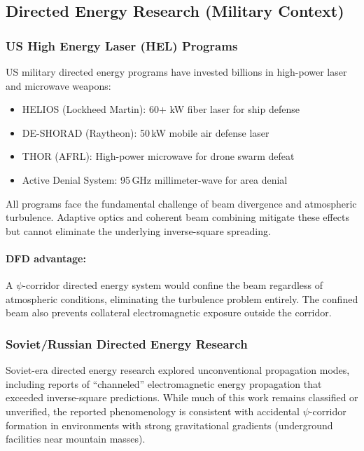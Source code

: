 \documentclass[11pt,a4paper]{article}
\begin{document}
\subsection{Directed Energy Research (Military Context)}

\subsubsection{US High Energy Laser (HEL) Programs}

US military directed energy programs have invested billions in
high-power laser and microwave weapons:
\begin{itemize}
\item HELIOS (Lockheed Martin): 60+ kW fiber laser for ship defense
\item DE-SHORAD (Raytheon): 50\,kW mobile air defense laser
\item THOR (AFRL): High-power microwave for drone swarm defeat
\item Active Denial System: 95\,GHz millimeter-wave for area denial
\end{itemize}

All programs face the fundamental challenge of beam divergence and
atmospheric turbulence. Adaptive optics and coherent beam combining
mitigate these effects but cannot eliminate the underlying
inverse-square spreading.

\paragraph{DFD advantage:} A $\psi$-corridor directed energy system
would confine the beam regardless of atmospheric conditions,
eliminating the turbulence problem entirely. The confined beam also
prevents collateral electromagnetic exposure outside the corridor.

\subsubsection{Soviet/Russian Directed Energy Research}

Soviet-era directed energy research explored unconventional
propagation modes, including reports of ``channeled'' electromagnetic
energy propagation that exceeded inverse-square predictions. While
much of this work remains classified or unverified, the reported
phenomenology is consistent with accidental $\psi$-corridor formation
in environments with strong gravitational gradients (underground
facilities near mountain masses).
\end{document}
